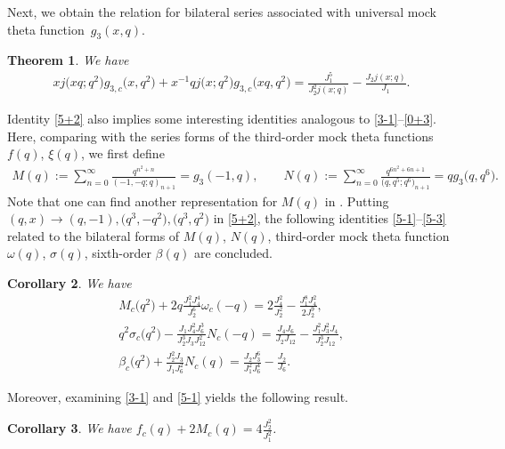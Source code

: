 \documentclass[pdftex]{sigma}
\numberwithin{equation}{section}
\newtheorem{Theorem}{Theorem}[section]
\newtheorem{Corollary}[Theorem]{Corollary}
\begin{document}
Next, we obtain the relation for bilateral series associated with universal mock theta function~$g_3(x,q)$.
\begin{Theorem}\label{5+1}
We have
\begin{align}\label{5+2}
xj\bigl(xq;q^2\bigr)g_{3,c}\bigl(x,q^2\bigr)+x^{-1}qj\bigl(x;q^2\bigr)g_{3,c}\bigl(xq,q^2\bigr)
=\frac{J_1^5}{J_2^2j(x;q)}-\frac{J_2j(x;q)}{J_1}.
\end{align}
\end{Theorem}
Identity \eqref{5+2} also implies some interesting identities analogous to \eqref{3-1}--\eqref{0+3}. Here, comparing with the series forms of the third-order mock theta functions $f(q)$, $\xi(q)$, we first define
\begin{gather*}
M(q):=\sum_{n=0}^{\infty}\frac{q^{n^2+n}}{(-1,-q;q)_{n+1}}=g_3(-1,q),\qquad
N(q):=\sum_{n=0}^{\infty}\frac{q^{6n^2+6n+1}}{\bigl(q,q^5;q^6\bigr)_{n+1}}=qg_3\bigl(q,q^6\bigr).
\end{gather*}
Note that one can find another representation for $M(q)$ in \cite{SW}. Putting $(q,x)\rightarrow(q,-1),\allowbreak \bigl(q^3,-q^2\bigr), \bigl(q^3,q^2\bigr)$ in \eqref{5+2}, the following identities \eqref{5-1}--\eqref{5-3} related to the bilateral forms of $M(q)$, $N(q)$, third-order mock theta function $\omega(q)$, $\sigma(q)$, sixth-order $\beta(q)$ are concluded.
\begin{Corollary}
We have
\begin{gather}
M_c\bigl(q^2\bigr)+2q\frac{J_1^2J_4^4}{J_2^6}\omega_c(-q)
=2\frac{J_4^2}{J_2^2}-\frac{J_1^8J_4^2}{2J_2^9},\label{5-1}\\
q^2\sigma_c\bigl(q^2\bigr)-\frac{J_1J_4^2J_6^3}{J_2^3J_3J_{12}^2}N_c(-q)
=\frac{J_4J_6}{J_2J_{12}}-\frac{J_1^2J_3^2J_4}{J_2^3J_{12}},\label{5-2}\\
\beta_c\bigl(q^2\bigr)+\frac{J_2^2J_3}{J_1J_6^2}N_c(q)
=\frac{J_2J_3^6}{J_1^2J_6^4}-\frac{J_2}{J_6}.\label{5-3}
\end{gather}
\end{Corollary}
Moreover, examining \eqref{3-1} and \eqref{5-1} yields the following result.
\begin{Corollary}
We have
$
f_c(q)+2M_c(q)=4\frac{J_2^2}{J_1^2}$.
\end{Corollary}
\end{document}
